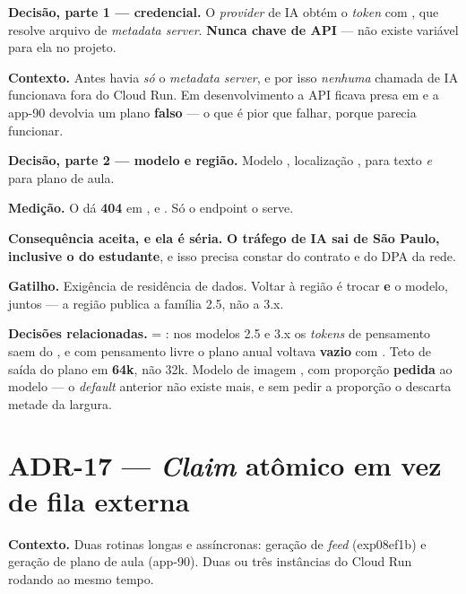 \textbf{Decisão, parte 1 --- credencial.} O \emph{provider} de IA obtém o
\emph{token} com , que resolve
 \seta{} arquivo de
 \seta{} \emph{metadata server}.
\textbf{Nunca chave de API} --- não existe variável para ela no projeto.

\textbf{Contexto.} Antes havia \emph{só} o \emph{metadata server}, e por isso
\emph{nenhuma} chamada de IA funcionava fora do Cloud Run. Em desenvolvimento a
API ficava presa em  e a app-90 devolvia um plano \textbf{falso} --- o
que é pior que falhar, porque parecia funcionar.

\textbf{Decisão, parte 2 --- modelo e região.} Modelo ,
localização , para texto \emph{e} para plano de aula.

\textbf{Medição.} O  dá \textbf{404} em ,
 e . Só o endpoint  o serve.

\textbf{Consequência aceita, e ela é séria.} \textbf{O tráfego de IA sai de São
Paulo, inclusive o do estudante}, e isso precisa constar do contrato e do DPA da rede.

\textbf{Gatilho.} Exigência de residência de dados. Voltar à região é trocar
 \textbf{e} o modelo, juntos --- a região publica a família
2.5, não a 3.x.

\textbf{Decisões relacionadas.}  = : nos
modelos 2.5 e 3.x os \emph{tokens} de pensamento saem do , e
com pensamento livre o plano anual voltava \textbf{vazio} com
. Teto de saída do plano em \textbf{64k}, não 32k.
Modelo de imagem , com proporção 
\textbf{pedida} ao modelo --- o \emph{default} anterior não existe mais, e sem
pedir a proporção o  descarta metade da largura.

\section{ADR-17 --- \emph{Claim} atômico em vez de fila externa}

\textbf{Contexto.} Duas rotinas longas e assíncronas: geração de \emph{feed}
(exp08ef1b) e geração de plano de aula (app-90). Duas ou três instâncias do Cloud Run
rodando ao mesmo tempo.

